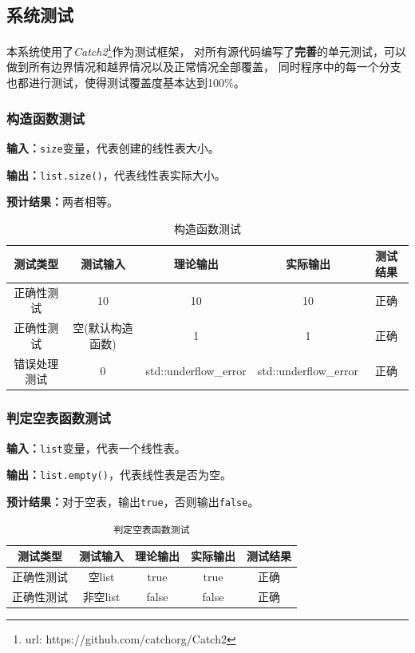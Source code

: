 \subsection{系统测试}
本系统使用了\textit{Catch2}\footnote{url: https://github.com/catchorg/Catch2}作为测试框架，
对所有源代码编写了\textbf{完善}的单元测试，可以做到所有边界情况和越界情况以及正常情况全部覆盖，
同时程序中的每一个分支也都进行测试，使得测试覆盖度基本达到100\%。
\subsubsection{构造函数测试}
\textbf{输入：}\texttt{size}变量，代表创建的线性表大小。
\par
\textbf{输出：}\texttt{list.size()}，代表线性表实际大小。
\par
\textbf{预计结果：}两者相等。
\begin{table}[h]
\centering
\caption{构造函数测试}
\begin{tabular}{@{}ccccc@{}}
\toprule
\multicolumn{1}{c}{测试类型}    & \multicolumn{1}{c}{测试输入} & \multicolumn{1}{c}{理论输出} & \multicolumn{1}{c}{实际输出} & \multicolumn{1}{c}{测试结果} \\ \midrule
\multicolumn{1}{c|}{正确性测试}  & 10&10&10&正确\\
\multicolumn{1}{c|}{正确性测试}  & 空(默认构造函数)&1&1&正确\\
\multicolumn{1}{c|}{错误处理测试} & 0& std::underflow\_error& std::underflow\_error& 正确\\ \bottomrule
\end{tabular}
\label{tab:inittest1}
\end{table}

\subsubsection{判定空表函数测试}
\textbf{输入：}\texttt{list}变量，代表一个线性表。
\par
\textbf{输出：}\texttt{list.empty()}，代表线性表是否为空。
\par
\textbf{预计结果：}对于空表，输出\texttt{true}，否则输出\texttt{false}。
\begin{table}[h]
\centering
    \caption{\texttt{判定空表函数测试}}
\begin{tabular}{@{}ccccc@{}}
\toprule
\multicolumn{1}{c}{测试类型}    & \multicolumn{1}{c}{测试输入} & \multicolumn{1}{c}{理论输出} & \multicolumn{1}{c}{实际输出} & \multicolumn{1}{c}{测试结果} \\ \midrule
\multicolumn{1}{c|}{正确性测试}  & 空list&true&true&正确\\
\multicolumn{1}{c|}{正确性测试}  & 非空list&false&false&正确\\ \bottomrule
\end{tabular}
\label{tab:emptytest1}
\end{table}


